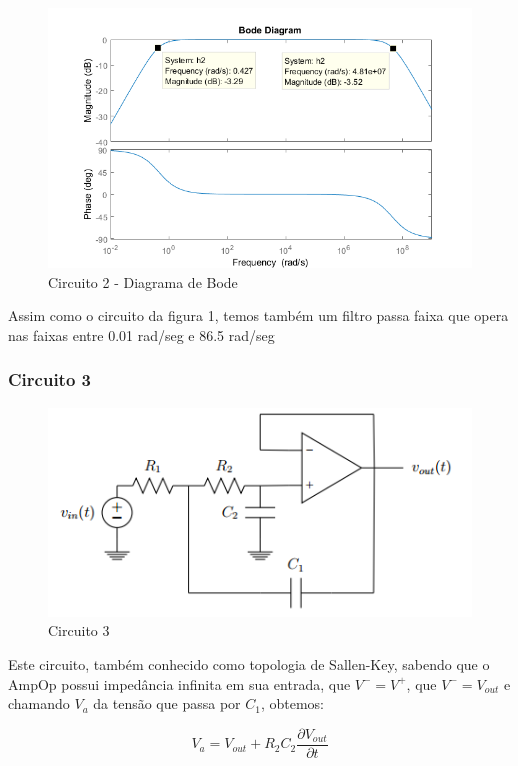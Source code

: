 \documentclass[a4paper, 12pt]{article}
\begin{document}
			\begin{figure}[!ht]
				\centering
				\includegraphics[scale=0.7]{img/1f_circ2.png}
				\caption{Circuito 2 - Diagrama de Bode}	
			\end{figure}			
			\newpage		
			Assim como o circuito da figura 1, temos também um filtro passa faixa que opera nas faixas entre 0.01 rad/seg e 86.5 rad/seg
			\subsubsection{Circuito 3}
			\begin{figure}[!ht]
				\centering
				\includegraphics{img/circuito3.png}
				\caption{Circuito 3}	
			\end{figure}			
			
			Este circuito, também conhecido como topologia de Sallen-Key, sabendo que o AmpOp possui impedância infinita em sua entrada, que $V^{-} = V^{+}$, que $V^{-} = V_{out}$ e chamando $V_{a}$ da tensão que passa por $C_{1}$, obtemos:
				
			\[
			V_{a} = V_{out} + R_{2}C_{2}\frac{\partial V_{out}}{\partial t}
			\] 	\\					
			
\end{document}
